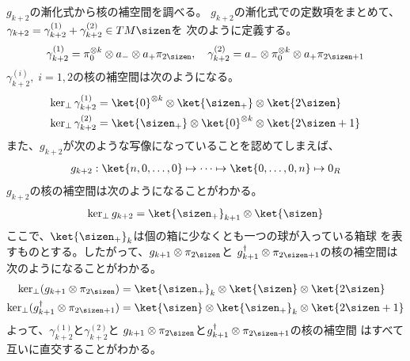 	$g_{k+2}$の漸化式から核の補空間を調べる。
	$g_{k+2}$の漸化式での定数項をまとめて、
	$\gamma_{k+2}=\gamma_{k+2}^{(1)}+\gamma_{k+2}^{(2)}\in TM\sizen$を
	次のように定義する。
	\begin{equation*}\begin{split} %
		\gamma_{k+2}^{(1)} = \pi_0^{\otimes k}\otimes a_-\otimes a_+\pi_\myeven
		,\quad \gamma_{k+2}^{(2)} = a_-\otimes \pi_0^{\otimes k}\otimes a_+\pi_\myodd
	\end{split}\end{equation*} %
	$\gamma_{k+2}^{(i)},\;i=1,2$の核の補空間は次のようになる。
	\begin{equation*}\begin{split} %
		\ker_\perp\gamma_{k+2}^{(1)}
			&= \ket{0}^{\otimes k}\otimes\ket{\sizen_+}\otimes\ket{\myeven} \\
		\ker_\perp\gamma_{k+2}^{(2)}
			&= \ket{\sizen_+}\otimes\ket{0}^{\otimes k}\otimes\ket{\myodd} \\
	\end{split}\end{equation*} %
	また、$g_{k+2}$が次のような写像になっていることを認めてしまえば、
	\begin{equation*}\begin{split} %
		g_{k+2}: \ket{n,0,\dots,0}\mapsto\cdots\mapsto\ket{0,\dots,0,n}
			\mapsto0_R
	\end{split}\end{equation*} %
	$g_{k+2}$の核の補空間は次のようになることがわかる。
	\begin{equation*}\begin{split} %
		\ker_\perp g_{k+2} = \ket{\sizen_+}_{k+1}\otimes\ket{\sizen}
	\end{split}\end{equation*} %
	ここで、$\ket{\sizen_+}_k$は個の箱に少なくとも一つの球が入っている箱球
	を表すものとする。したがって、$g_{k+1}\otimes\pi_\myeven$と
	$g_{k+1}^\dag\otimes\pi_\myodd$の核の補空間は次のようになることがわかる。
	\begin{equation*}\begin{split} %
		\ker_\perp(g_{k+1}\otimes\pi_\myeven)
			&= \ket{\sizen_+}_k\otimes\ket{\sizen}\otimes\ket{\myeven} \\
		\ker_\perp(g_{k+1}^\dag\otimes\pi_\myodd)
			&= \ket{\sizen}\otimes\ket{\sizen_+}_k\otimes\ket{\myodd} \\
	\end{split}\end{equation*} %
	よって、$\gamma_{k+2}^{(1)}$と$\gamma_{k+2}^{(2)}$と
	$g_{k+1}\otimes\pi_\myeven$と$g_{k+1}^\dag\otimes\pi_\myodd$の核の補空間
	はすべて互いに直交することがわかる。

